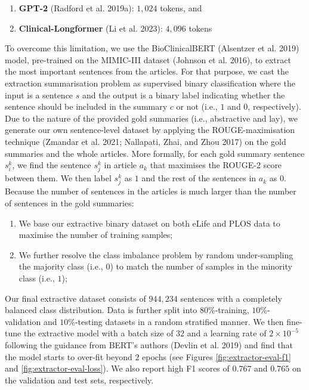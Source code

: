 \documentclass[
]{article}
\providecommand{\tightlist}{%
  \setlength{\itemsep}{0pt}\setlength{\parskip}{0pt}}
\begin{document}
\begin{enumerate}
\def\labelenumi{\roman{enumi}.}
\tightlist
\item
  \textbf{GPT-2} (Radford et al. 2019a): \(1,024\) tokens, and
\item
  \textbf{Clinical-Longformer} (Li et al. 2023): \(4,096\) tokens
\end{enumerate}

To overcome this limitation, we use the BioClinicalBERT (Alsentzer et
al. 2019) model, pre-trained on the MIMIC-III dataset (Johnson et al.
2016), to extract the most important sentences from the articles. For
that purpose, we cast the extraction summarisation problem as supervised
binary classification where the input is a sentence \(s\) and the output
is a binary label indicating whether the sentence should be included in
the summary \(c\) or not (i.e., \(1\) and \(0\), respectively). Due to
the nature of the provided gold summaries (i.e., abstractive and lay),
we generate our own sentence-level dataset by applying the
ROUGE-maximisation technique (Zmandar et al. 2021; Nallapati, Zhai, and
Zhou 2017) on the gold summaries and the whole articles. More formally,
for each gold summary sentence \(s_{i}^{k}\), we find the sentence
\(s_{j}^{k}\) in article \(a_{k}\) that maximises the ROUGE-2 score
between them. We then label \(s_{j}^{k}\) as \(1\) and the rest of the
sentences in \(a_{k}\) as \(0\). Because the number of sentences in the
articles is much larger than the number of sentences in the gold
summaries:

\begin{enumerate}
\def\labelenumi{\roman{enumi}.}
\tightlist
\item
  We base our extractive binary dataset on both eLife and PLOS data to
  maximise the number of training samples;
\item
  We further resolve the class imbalance problem by random
  under-sampling the majority class (i.e., \(0\)) to match the number of
  samples in the minority class (i.e., \(1\));
\end{enumerate}

Our final extractive dataset consists of \(944,234\) sentences with a
completely balanced class distribution. Data is further split into
\(80\%\)-training, \(10\%\)-validation and \(10\%\)-testing datasets in
a random stratified manner. We then fine-tune the extractive model with
a batch size of \(32\) and a learning rate of \(2 \times 10^{-5}\)
following the guidance from BERT's authors (Devlin et al. 2019) and find
that the model starts to over-fit beyond \(2\) epochs (see Figures
\ref{fig:extractor-eval-f1} and \ref{fig:extractor-eval-loss}). We also
report high F1 scores of \(0.767\) and \(0.765\) on the validation and
test sets, respectively.
\end{document}
